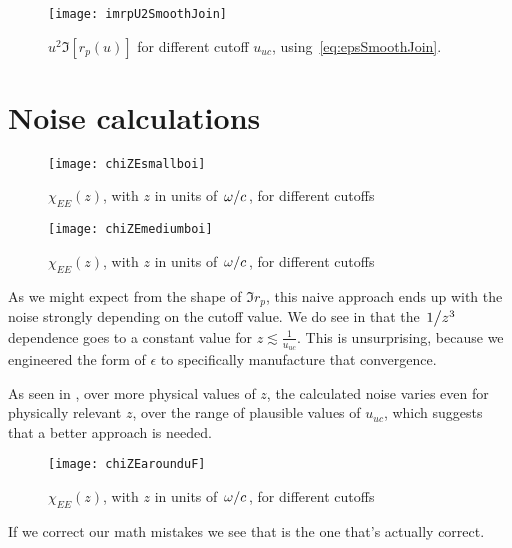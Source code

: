 \documentclass[11pt]{article}
\begin{document}
	\begin{figure}[htp]
		\centering
		\texttt{[image: imrpU2SmoothJoin]}
		\caption{$u^2 \Im[r_p(u)]$ for different cutoff $u_{uc}$, using~\eqref{eq:epsSmoothJoin}.} \label{fig:u2imrpVsCutoffSmoothJoin}
	\end{figure}

	\section{Noise calculations} \label{sec:noise}
	\begin{figure}[htp]
		\centering
		\texttt{[image: chiZEsmallboi]}
		\caption{$\chi_{EE}(z)$, with $z$ in units of $\flatfrac{\omega}{c}$, for different cutoffs} \label{fig:chiZRange}
	\end{figure}
	\begin{figure}[htp]
		\centering
		\texttt{[image: chiZEmediumboi]}
		\caption{$\chi_{EE}(z)$, with $z$ in units of $\flatfrac{\omega}{c}$, for different cutoffs} \label{fig:chiZMedium}
	\end{figure}
	As we might expect from the shape of $\Im r_p$, this naive approach ends up with the noise strongly depending on the cutoff value.
	We do see in  that the $\flatfrac{1}{z^3}$ dependence goes to a constant value for $z \lesssim \frac{1}{u_{uc}}$.
	This is unsurprising, because we engineered the form of $\epsilon$ to specifically manufacture that convergence.

	As seen in , over more physical values of $z$, the calculated noise varies even for physically relevant $z$, over the range of plausible values of $u_{uc}$, which suggests that a better approach is needed.

	\begin{figure}[htp]
		\centering
		\texttt{[image: chiZEarounduF]}
		\caption{$\chi_{EE}(z)$, with $z$ in units of $\flatfrac{\omega}{c}$, for different cutoffs} \label{fig:chiZEarounduF}
	\end{figure}

	If we correct our math mistakes we see that  is the one that's actually correct.

	\newpage
	\listoftodos
	\newpage
	\printbibliography
\end{document}
